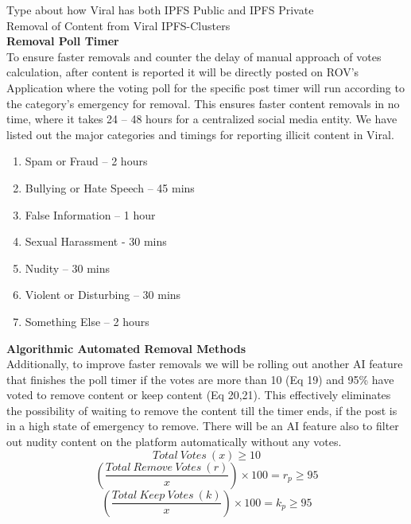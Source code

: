 \documentclass[10pt]{article}
\begin{document}
Type about how Viral has both IPFS Public and IPFS Private\\
Removal of Content from Viral IPFS-Clusters\\


\textbf{Removal Poll Timer}\\

To ensure faster removals and counter the delay of manual approach of votes calculation, after content is reported it will be directly posted on ROV’s Application where the voting poll for the specific post timer will run according to the category’s emergency for removal. This ensures faster content removals in no time, where it takes 24 – 48 hours for a centralized social media entity. We have listed out the major categories and timings for reporting illicit content in Viral.

\begin{enumerate}[leftmargin=+0.2in]
\item Spam or Fraud – 2 hours
\item Bullying or Hate Speech – 45 mins
\item False Information – 1 hour
\item Sexual Harassment - 30 mins
\item Nudity – 30 mins
\item Violent or Disturbing – 30 mins
\item Something Else – 2 hours
\end{enumerate}

\textbf{Algorithmic Automated Removal Methods}\\

Additionally, to improve faster removals we will be rolling out another AI feature that finishes the poll timer if the votes are more than 10 (Eq 19) and 95\% have voted to remove content or keep content (Eq 20,21). This effectively eliminates the possibility of waiting to remove the content till the timer ends, if the post is in a high state of emergency to remove. There will be an AI feature also to filter out nudity content on the platform automatically without any votes.\\

\begin{equation}
Total\:Votes\:(x) \geq10
\end{equation}
\begin{equation}
(\frac{Total\:Remove\:Votes\:(r)}{x}) \times  100 = r_p \geq 95
\end{equation}
\begin{equation}
(\frac{Total\:Keep\:Votes\:(k)}{x}) \times  100 = k_p \geq 95
\end{equation}
\end{document}
